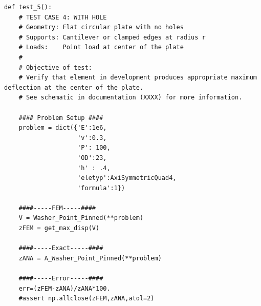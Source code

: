 \documentclass[10pt,letterpaper]{report}
\numberwithin{equation}{chapter}
\begin{document}
\begin{lstlisting}
def test_5():
    # TEST CASE 4: WITH HOLE
    # Geometry: Flat circular plate with no holes
    # Supports: Cantilever or clamped edges at radius r
    # Loads: 	Point load at center of the plate
    #
    # Objective of test: 
    # Verify that element in development produces appropriate maximum deflection at the center of the plate. 
    # See schematic in documentation (XXXX) for more information.
    
    #### Problem Setup ####
    problem = dict({'E':1e6,
                    'v':0.3,
                    'P': 100,
                    'OD':23,
                    'h' : .4,
                    'eletyp':AxiSymmetricQuad4,
                    'formula':1})
    
    ####-----FEM-----####
    V = Washer_Point_Pinned(**problem)
    zFEM = get_max_disp(V)
    
    ####-----Exact-----####
    zANA = A_Washer_Point_Pinned(**problem)
    
    ####-----Error-----####
    err=(zFEM-zANA)/zANA*100.
    #assert np.allclose(zFEM,zANA,atol=2)
\end{lstlisting}
\end{document}
